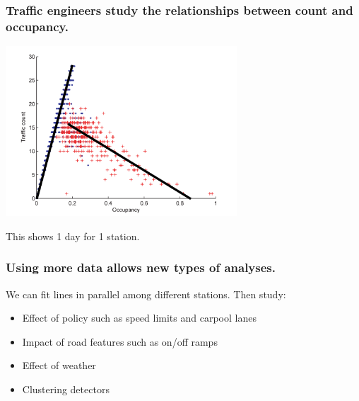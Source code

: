 \documentclass{beamer}
\begin{document}
\begin{frame}

    \frametitle{Traffic engineers study the relationships between count and
    occupancy.}

\centerline{\includegraphics[height=2.5in]{fundamental_diagram.png}}

This shows 1 day for 1 station.

\end{frame}
\begin{frame}

    \frametitle{Using more data allows new types of analyses.}


We can fit lines in parallel among different stations. Then study:

    \begin{itemize}
        \item Effect of policy such as speed limits and carpool lanes
        \item Impact of road features such as on/off ramps
        \item Effect of weather
        \item Clustering detectors
    \end{itemize}

\end{frame}
\end{document}
